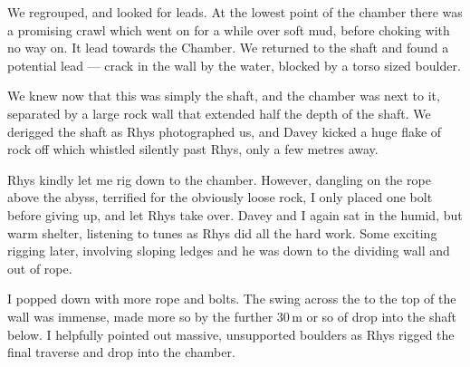 We regrouped, and looked for leads. At the lowest point of the chamber there was a promising crawl which went on for a while over soft mud, before choking with no way on. It lead towards the  Chamber. We returned to the shaft and found a potential lead --- crack in the wall by the water, blocked by a torso sized boulder.

We knew now that this was simply the shaft, and the chamber was next to it, separated by a large rock wall that extended half the depth of the shaft. We derigged the shaft as Rhys photographed us, and Davey kicked a huge flake of rock off which whistled silently past Rhys, only a few metres away. 

Rhys kindly let me rig down to the  chamber. However, dangling on the rope above the abyss, terrified for the obviously loose rock, I only placed one bolt before giving up, and let Rhys take over. Davey and I again sat in the humid, but warm shelter, listening to tunes as Rhys did all the hard work. Some exciting rigging later, involving sloping ledges and he was down to the dividing wall and out of rope.

I popped down with more rope and bolts. The swing across the to the top of the wall was immense, made more so by the further 30\,m or so of drop into the shaft below. I helpfully pointed out massive, unsupported boulders as Rhys rigged the final traverse and drop into the chamber.


